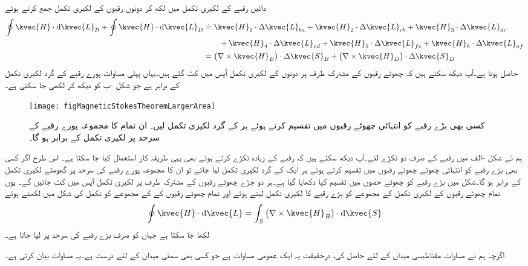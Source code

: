 دائیں رقبے کے لکیری تکمل میں  لکھ کر دونوں رقبوں کے لکیری تکمل جمع کرتے ہوئے
\begin{align*}
\oint \kvec{H} \cdot \dif \kvec{L}_B+\oint \kvec{H} \cdot \dif \kvec{L}_D&\overset{.}{=} \kvec{H}_1 \cdot \Delta\kvec{L}_{ba}+\kvec{H}_2 \cdot \Delta\kvec{L}_{cb}+ \kvec{H}_3 \cdot \Delta\kvec{L}_{dc} \\
& \quad \quad + \kvec{H}_4 \cdot \Delta\kvec{L}_{ed}+ \kvec{H}_5 \cdot \Delta\kvec{L}_{fe}+ \kvec{H}_6 \cdot \Delta\kvec{L}_{af}\\
&\overset{.}{=}\left(\nabla \times \kvec{H}_B \right) \cdot  \Delta \kvec{S}_B+\left(\nabla \times \kvec{H}_D \right) \cdot  \Delta \kvec{S}_D
\end{align*}
حاصل ہوتا ہے۔آپ دیکھ سکتے ہیں کہ چھوٹے رقبوں کے مشترک طرف  پر دونوں  کے لکیری تکمل آپس میں کٹ گئے ہیں۔یہاں پہلی مساوات پورے رقبے کے گرد لکیری تکمل کے برابر ہے جو شکل -ب کو دیکھ کر لکھی جا سکتی ہے۔
\begin{figure}
\centering
\texttt{[image: figMagneticStokesTheoremLargerArea]}
\caption{کسی بھی بڑے رقبے کو انتہائی چھوٹے رقبوں میں تقسیم کرتے ہوئے ہر کے گرد لکیری تکمل لیں۔ ان تمام کا مجموعہ پورے رقبے کے سرحد پر لکیری تکمل کے برابر ہو گا۔}
\label{شکل_مقناطیسی_سٹوکس_بڑا_رقبہ}
\end{figure}
ہم نے شکل -الف میں رقبے کے صرف دو ٹکڑے لئے۔آپ دیکھ سکتے ہیں کہ رقبے کے زیادہ ٹکڑے کرتے ہوئے  بھی یہی طریقہ کار استعمال کیا جا سکتا ہے۔  اس طرح اگر کسی بھی بڑے رقبے کو انتہائی چھوٹے چھوٹے  رقبوں میں تقسیم کرتے ہوئے ہر ایک کے گرد لکیری تکمل لیا جائے  تو ان کا مجموعہ  پورے رقبے کی سرحد پر گھومتے لکیری تکمل کے برابر ہو گا۔شکل  میں بڑے رقبے کو چھوٹے حصوں میں تقسیم کیا دکھایا گیا ہے۔ہر دو جڑے چھوٹے رقبوں کے مشترکہ طرف پر لکیری تکمل آپس میں کٹ جائیں گے۔ یوں تمام چھوٹے رقبوں کے لکیری تکمل کے مجموعے کو بڑے رقبے کا لکیری تکمل لیتے ہوئے اور تمام چھوٹے رقبوں کے  کے مجموعے کو تکمل کی شکل میں لکھتے ہوئے
\begin{align}\label{مساوات_مقناطیسی_سٹوکس_مساوات}
\oint \kvec{H} \cdot \dif \kvec{L} =\int_S \left(\nabla \times \kvec{H}_B \right) \cdot  \dif \kvec{S}
\end{align}
لکھا جا سکتا ہے جہاں  کو صرف بڑے رقبے  کی سرحد پر لیا جاتا ہے۔

اگرچہ ہم نے مساوات  مقناطیسی میدان کے لئے حاصل کی، درحقیقت یہ ایک عمومی مساوات ہے جو کسی بھی سمتی میدان کے لئے درست ہے۔یہ مساوات  بیان کرتی ہے۔

